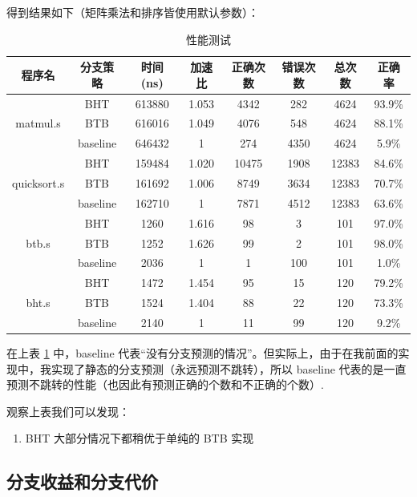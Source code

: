 \documentclass{article}
\begin{document}
得到结果如下（矩阵乘法和排序皆使用默认参数）：
\begin{table}[H]
  \centering
  \begin{tabular}{c c c c c c c c}
    \toprule
    程序名 & 分支策略 & 时间 (ns) & 加速比 & 正确次数 & 错误次数 & 总次数 & 正确率\\
    \midrule
    \multirow{3}{*}{matmul.s} & BHT & 613880 & 1.053 & 4342 & 282 & 4624 & 93.9\% \\
                              & BTB & 616016 & 1.049 & 4076 & 548 & 4624 & 88.1\% \\
                              & baseline & 646432 & 1 & 274 & 4350 & 4624 & 5.9\% \\
    \midrule
    \multirow{3}{*}{quicksort.s} & BHT & 159484 & 1.020 & 10475 & 1908 & 12383 & 84.6\% \\
                                 & BTB & 161692 & 1.006 & 8749 & 3634 & 12383 & 70.7\% \\
                                 & baseline & 162710 & 1 & 7871 & 4512 & 12383 & 63.6\% \\
    \midrule
    \multirow{3}{*}{btb.s} & BHT & 1260 & 1.616 & 98 & 3 & 101 & 97.0\% \\
                           & BTB & 1252 & 1.626 & 99 & 2 & 101 & 98.0\% \\
                           & baseline & 2036 & 1 & 1 & 100 & 101 & 1.0\% \\
    \midrule
    \multirow{3}{*}{bht.s} & BHT & 1472 & 1.454 & 95 & 15 & 120 & 79.2\% \\
                           & BTB & 1524 & 1.404 & 88 & 22 & 120 & 73.3\% \\
                           & baseline & 2140 & 1 & 11 & 99 & 120 & 9.2\% \\
    \bottomrule
  \end{tabular}
  \caption{性能测试}
  \label{tb:perf}
\end{table}
在上表 \ref{tb:perf} 中，baseline 代表“没有分支预测的情况”。但实际上，由于在我前面的实现中，我实现了静态的分支预测（永远预测不跳转），所以 baseline 代表的是一直预测不跳转的性能（也因此有预测正确的个数和不正确的个数）.

观察上表我们可以发现：

\begin{enumerate}
  \item
    BHT 大部分情况下都稍优于单纯的 BTB 实现
\end{enumerate}

\subsection{分支收益和分支代价}
\end{document}
